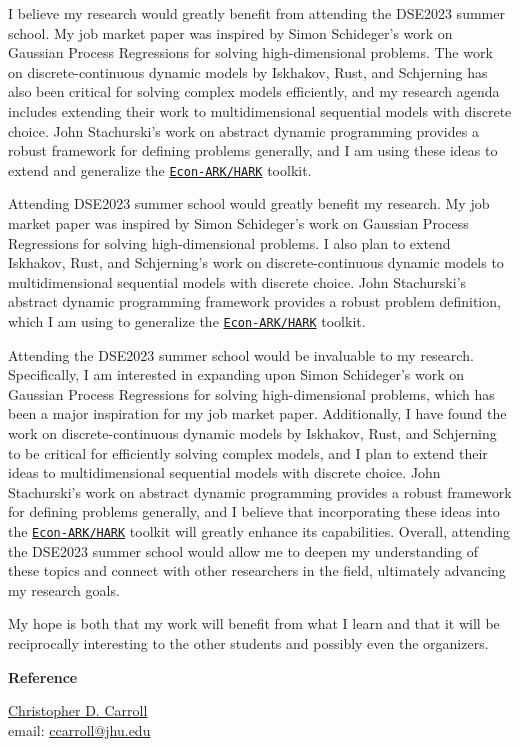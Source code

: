 \documentclass[11pt, letterpaper]{awesome-cv}
\begin{document}
\begin{cvletter}

I believe my research would greatly benefit from attending the DSE2023 summer school. My job market paper was inspired by Simon Schideger's work on Gaussian Process Regressions for solving high-dimensional problems. The work on discrete-continuous dynamic models by Iskhakov, Rust, and Schjerning has also been critical for solving complex models efficiently, and my research agenda includes extending their work to multidimensional sequential models with discrete choice. John Stachurski's work on abstract dynamic programming provides a robust framework for defining problems generally, and I am using these ideas to extend and generalize the \href{https://github.com/econ-ark/HARK}{\texttt{Econ-ARK/HARK}} toolkit.

Attending DSE2023 summer school would greatly benefit my research. My job market paper was inspired by Simon Schideger's work on Gaussian Process Regressions for solving high-dimensional problems. I also plan to extend Iskhakov, Rust, and Schjerning's work on discrete-continuous dynamic models to multidimensional sequential models with discrete choice. John Stachurski's abstract dynamic programming framework provides a robust problem definition, which I am using to generalize the \href{https://github.com/econ-ark/HARK}{\texttt{Econ-ARK/HARK}} toolkit.

Attending the DSE2023 summer school would be invaluable to my research. Specifically, I am interested in expanding upon Simon Schideger's work on Gaussian Process Regressions for solving high-dimensional problems, which has been a major inspiration for my job market paper. Additionally, I have found the work on discrete-continuous dynamic models by Iskhakov, Rust, and Schjerning to be critical for efficiently solving complex models, and I plan to extend their ideas to multidimensional sequential models with discrete choice. John Stachurski's work on abstract dynamic programming provides a robust framework for defining problems generally, and I believe that incorporating these ideas into the \href{https://github.com/econ-ark/HARK}{\texttt{Econ-ARK/HARK}} toolkit will greatly enhance its capabilities. Overall, attending the DSE2023 summer school would allow me to deepen my understanding of these topics and connect with other researchers in the field, ultimately advancing my research goals.


My hope is both that my work will benefit from what I learn and that it will be reciprocally interesting to the other students and possibly even the organizers.

\textbf{Reference}

\href{http://www.econ2.jhu.edu/people/ccarroll/index.html}{Christopher D. Carroll} \\
email: \href{mailto:ccarroll@jhu.edu}{ccarroll@jhu.edu}

\end{cvletter}

\makeletterclosing
\end{document}
